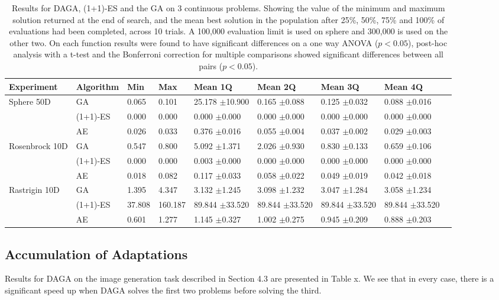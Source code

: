 \documentclass[runningheads,a4paper]{llncs}
\begin{document}
 \begin{table}[t!]
    \begin{tabular}{ | p{1.8cm} | l | l | l | l | l | l | l | l | |}
    \hline
    Experiment & Algorithm & Min & Max & Mean 1Q & Mean 2Q & Mean 3Q & Mean 4Q \\ \hline
    Sphere 50D & GA & 0.065 & 0.101 & 25.178 \(\pm\)10.900 & 0.165 \(\pm\)0.088 & 0.125 \(\pm\)0.032 & 0.088 \(\pm\)0.016\\
    & (1+1)-ES & 0.000 & 0.000 & 0.000 \(\pm\)0.000 & 0.000 \(\pm\)0.000 & 0.000 \(\pm\)0.000 & 0.000 \(\pm\)0.000\\
    & AE & 0.026 & 0.033 & 0.376 \(\pm\)0.016 & 0.055 \(\pm\)0.004 & 0.037 \(\pm\)0.002 & 0.029 \(\pm\)0.003\\\hline
    Rosenbrock 10D & GA & 0.547 & 0.800 & 5.092 \(\pm\)1.371 & 2.026 \(\pm\)0.930 & 0.830 \(\pm\)0.133 & 0.659 \(\pm\)0.106\\
    & (1+1)-ES & 0.000 & 0.000 & 0.003 \(\pm\)0.000 & 0.000 \(\pm\)0.000 & 0.000 \(\pm\)0.000 & 0.000 \(\pm\)0.000\\
    & AE & 0.018 & 0.082 & 0.117 \(\pm\)0.033 & 0.058 \(\pm\)0.022 & 0.049 \(\pm\)0.019 & 0.042 \(\pm\)0.018\\\hline
     Rastrigin 10D & GA & 1.395 & 4.347 & 3.132 \(\pm\)1.245 & 3.098 \(\pm\)1.232 & 3.047 \(\pm\)1.284 & 3.058 \(\pm\)1.234\\ 
    & (1+1)-ES & 37.808 & 160.187 & 89.844 \(\pm\)33.520 & 89.844 \(\pm\)33.520 & 89.844 \(\pm\)33.520 & 89.844 \(\pm\)33.520\\
    & AE & 0.601 & 1.277 & 1.145 \(\pm\)0.327 & 1.002 \(\pm\)0.275 & 0.945 \(\pm\)0.209 & 0.888 \(\pm\)0.203\\\hline
    \end{tabular}
    \label{table:continuous_results}
    \caption{Results for DAGA, (1+1)-ES and the GA on 3 continuous problems. Showing the value of the minimum and maximum solution returned at the end of search, and the mean best solution in the population after 25\%, 50\%, 75\% and 100\% of evaluations had been completed, across 10 trials. A 100,000 evaluation limit is used on sphere and 300,000 is used on the other two.  On each function results were found to have significant differences on a one way ANOVA (\(p<0.05\)), post-hoc analysis with a t-test and the Bonferroni correction for multiple comparisons showed significant differences between all pairs (\(p<0.05\)).}
\end{table}


\subsection{Accumulation of Adaptations}
Results for DAGA on the image generation task described in Section 4.3 are presented in Table x. We see that in every case, there is a significant speed up when DAGA solves the first two problems before solving the third. 
\end{document}
